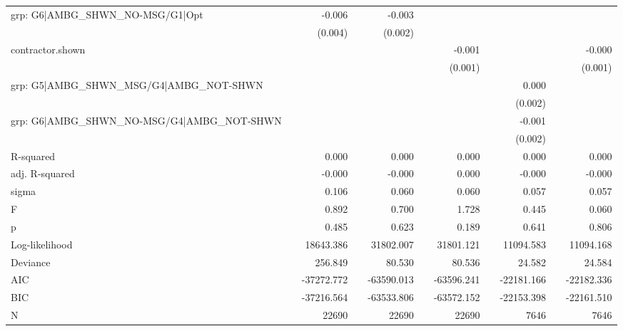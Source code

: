 \begin{tabular}{lcD{.}{.}{7}cD{.}{.}{7}cD{.}{.}{7}cD{.}{.}{7}cD{.}{.}{7}}
grp: G6|AMBG_SHWN_NO-MSG/G1|Opt           &  &  -0.006      &&   -0.003     &&              &&              &&             \\
                                          &  &  (0.004)     &&   (0.002)    &&              &&              &&             \\
contractor.shown                          &  &              &&              &&  -0.001      &&              &&  -0.000     \\
                                          &  &              &&              &&  (0.001)     &&              &&  (0.001)    \\
grp: G5|AMBG_SHWN_MSG/G4|AMBG_NOT-SHWN    &  &              &&              &&              &&   0.000      &&             \\
                                          &  &              &&              &&              &&  (0.002)     &&             \\
grp: G6|AMBG_SHWN_NO-MSG/G4|AMBG_NOT-SHWN &  &              &&              &&              &&  -0.001      &&             \\
                                          &  &              &&              &&              &&  (0.002)     &&             \\
\midrule
R-squared                                 &  &       0.000  &&       0.000  &&       0.000  &&       0.000  &&       0.000 \\
adj. R-squared                            &  &      -0.000  &&      -0.000  &&       0.000  &&      -0.000  &&      -0.000 \\
sigma                                     &  &       0.106  &&       0.060  &&       0.060  &&       0.057  &&       0.057 \\
F                                         &  &       0.892  &&       0.700  &&       1.728  &&       0.445  &&       0.060 \\
p                                         &  &       0.485  &&       0.623  &&       0.189  &&       0.641  &&       0.806 \\
Log-likelihood                            &  &   18643.386  &&   31802.007  &&   31801.121  &&   11094.583  &&   11094.168 \\
Deviance                                  &  &     256.849  &&      80.530  &&      80.536  &&      24.582  &&      24.584 \\
AIC                                       &  &  -37272.772  &&  -63590.013  &&  -63596.241  &&  -22181.166  &&  -22182.336 \\
BIC                                       &  &  -37216.564  &&  -63533.806  &&  -63572.152  &&  -22153.398  &&  -22161.510 \\
N                                         &  &   22690      &&   22690      &&   22690      &&    7646      &&    7646     \\
\bottomrule
\end{tabular}
